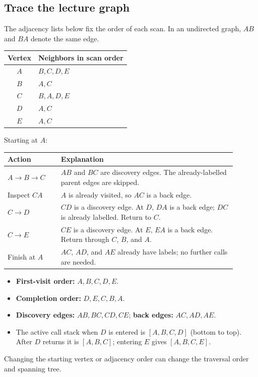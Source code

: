\documentclass[11pt,letterpaper]{article}
\begin{document}
\subsection{Trace the lecture graph}
The adjacency lists below fix the order of each scan. In an undirected graph, $AB$ and $BA$ denote the same edge.
\begin{center}
\begin{tabular}{cl}
\toprule
Vertex & Neighbors in scan order \\
\midrule
$A$ & $B,C,D,E$ \\
$B$ & $A,C$ \\
$C$ & $B,A,D,E$ \\
$D$ & $A,C$ \\
$E$ & $A,C$ \\
\bottomrule
\end{tabular}
\end{center}
Starting at $A$:
\begin{center}
\begin{tabular}{p{0.21\linewidth}p{0.69\linewidth}}
\toprule
Action & Explanation \\
\midrule
$A\to B\to C$ & $AB$ and $BC$ are discovery edges. The already-labelled parent edges are skipped. \\
Inspect $CA$ & $A$ is already visited, so $AC$ is a back edge. \\
$C\to D$ & $CD$ is a discovery edge. At $D$, $DA$ is a back edge; $DC$ is already labelled. Return to $C$. \\
$C\to E$ & $CE$ is a discovery edge. At $E$, $EA$ is a back edge. Return through $C$, $B$, and $A$. \\
Finish at $A$ & $AC$, $AD$, and $AE$ already have labels; no further calls are needed. \\
\bottomrule
\end{tabular}
\end{center}
\begin{itemize}
    \item \textbf{First-visit order:} $A,B,C,D,E$.
    \item \textbf{Completion order:} $D,E,C,B,A$.
    \item \textbf{Discovery edges:} $AB,BC,CD,CE$; \textbf{back edges:} $AC,AD,AE$.
    \item The active call stack when $D$ is entered is $[A,B,C,D]$ (bottom to top). After $D$ returns it is $[A,B,C]$; entering $E$ gives $[A,B,C,E]$.
\end{itemize}
Changing the starting vertex or adjacency order can change the traversal order and spanning tree.
\end{document}
